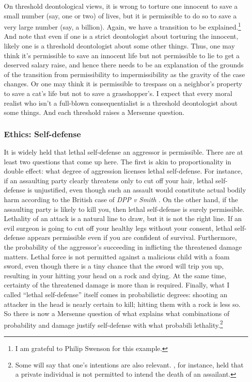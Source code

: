 On threshold deontological views, it is wrong to torture one innocent to save a small number (say, one or two) of lives,
but it is permissible to do so to save a very large number (say, a billion). Again, we have a transition to be 
explained.\footnote{I am grateful to Philip Swenson for this example.} And note that even if one is a strict deontologist
about torturing the innocent, likely one is a threshold deontologist about some other things. Thus, one may think it's
permissible to save an innocent life but not permissible to lie to get a deserved salary raise,
and hence there needs to be an explanation of the grounds of the transition from permissibility to impermissibility
as the gravity of the case changes. Or
one may think it is permissible to trespass on a neighbor's property to save a cat's life but not to save a grasshopper's.
I expect that every moral realist who isn't a full-blown consequentialist is a threshold deontologist about some things.
And each threshold raises a Mersenne question.

\subsubsection{Ethics: Self-defense}
It is widely held that lethal self-defense an aggressor is permissible. There are at least two questions that come up here.
The first is akin to proportionality in double effect: what degree of aggression licenses lethal self-defense. For instance, if an assaulting party clearly threatens only to cut off your 
hair, lethal self-defense is unjustified, even though such an assault would constitute actual bodily harm 
according to the British case of \textit{DPP v Smith} \parencite[p.~73]{McCombe2017}. On the other hand, 
if the assaulting party is likely to kill you, then lethal self-defense is surely permissible. 
Lethality of an attack is a natural line to draw, but it is not the right line. If an evil surgeon is going to 
cut off your healthy legs without your consent, lethal self-defense appears permissible even if 
you are confident of survival. Furthermore, the probability of the aggressor's succeeding in inflicting the 
threatened damage matters. Lethal force is not permitted against a malicious child with a foam sword, even though 
there is a tiny chance that the sword will trip you up, resulting in your hitting your head on a rock and dying. 
At the same time, certainty of the threatened damage is more than is required. Finally, what I called 
``lethal self-defense'' itself comes in probabilistic degrees: shooting an attacker in the head is nearly
certain to kill; hitting them with a rock is less so. So there is now a Mersenne question of 
what explains what combinations of probability and damage justify self-defense with what 
probabili lethality.\footnote{Some will say that one's intentions are also
relevant.  , for instance, held that a private individual is not permitted to intend the death of 
an assailant.}

